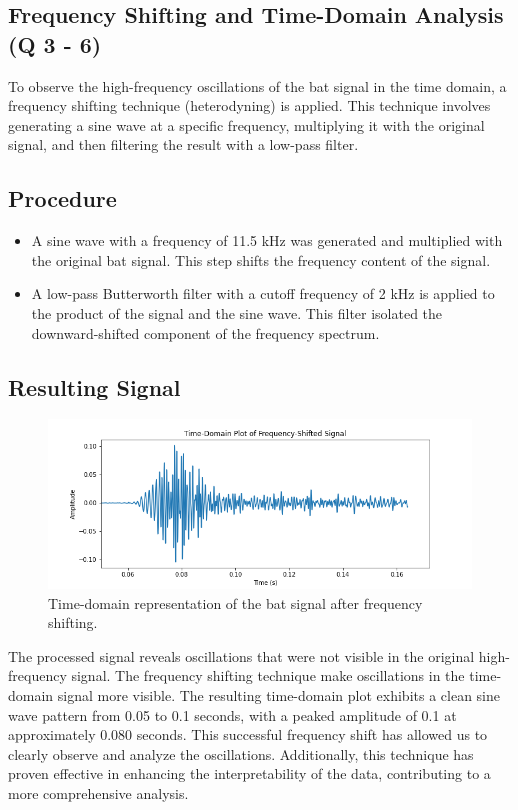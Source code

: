 \documentclass[12pt]{article}
\begin{document}
\subsection{Frequency Shifting and Time-Domain Analysis (Q 3 - 6)}
To observe the high-frequency oscillations of the bat signal in the time domain, a frequency shifting technique (heterodyning) is applied. This technique involves generating a sine wave at a specific frequency, multiplying it with the original signal, and then filtering the result with a low-pass filter.

\subsection*{Procedure}
\begin{itemize}
    \item A sine wave with a frequency of 11.5 kHz was generated and multiplied with the original bat signal. This step shifts the frequency content of the signal.
    
    \item A low-pass Butterworth filter with a cutoff frequency of 2 kHz is applied to the product of the signal and the sine wave. This filter isolated the downward-shifted component of the frequency spectrum.
\end{itemize}

\subsection*{Resulting Signal}
\begin{figure}[h]
\centering
\includegraphics[width=1\textwidth]{shifted_time_domain.png}
\caption{Time-domain representation of the bat signal after frequency shifting.}
\end{figure}

The processed signal reveals oscillations that were not visible in the original high-frequency signal. The frequency shifting technique make oscillations in the time-domain signal more visible. The resulting time-domain plot exhibits a clean sine wave pattern from 0.05 to 0.1 seconds, with a peaked amplitude of 0.1 at approximately 0.080 seconds. This successful frequency shift has allowed us to clearly observe and analyze the oscillations. Additionally, this technique has proven effective in enhancing the interpretability of the data, contributing to a more comprehensive analysis.
\end{document}
